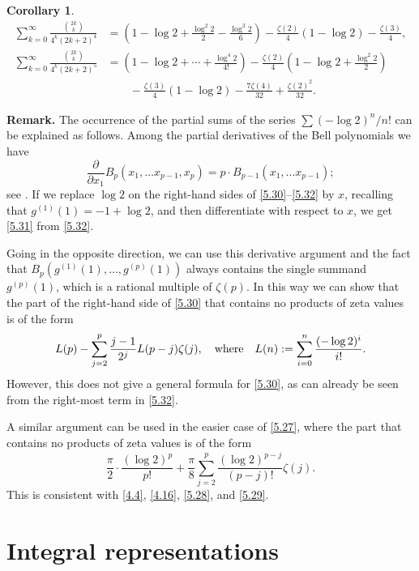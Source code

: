 \documentclass{amsart}
\newtheorem{corollary}[theorem]{Corollary}
\theoremstyle{definition}
\theoremstyle{remark}
\numberwithin{equation}{section}
\begin{document}
\begin{corollary}\label{cor:5.5}
\begin{align}
\sum_{k=0}^\infty\frac{\binom{2k}{k}}{4^k(2k+2)^4}
&=\left(1-\log{2}+\frac{\log^2{2}}{2}-\frac{\log^3{2}}{6}\right)
-\frac{\zeta(2)}{4}(1-\log{2})-\frac{\zeta(3)}{4},\label{5.31}\\
\sum_{k=0}^\infty\frac{\binom{2k}{k}}{4^k(2k+2)^5}
&=\left(1-\log{2}+\cdots+\frac{\log^4{2}}{4!}\right)
-\frac{\zeta(2)}{4}\left(1-\log{2}+\frac{\log^2{2}}{2}\right)\label{5.32}\\
&\qquad-\frac{\zeta(3)}{4}(1-\log{2})-\frac{7\zeta(4)}{32}+\frac{\zeta(2)^2}{32}.\nonumber
\end{align}
\end{corollary}

\noindent
{\bf Remark.} The occurrence of the partial sums of the series
$\sum(-\log{2})^n/n!$ can be explained as follows. Among the partial derivatives
of the Bell polynomials we have
\begin{equation}\label{5.33}
\frac{\partial}{\partial x_1}B_p(x_1,\ldots x_{p-1},x_p) 
= p\cdot B_{p-1}(x_1,\ldots x_{p-1});
\end{equation}
see \cite[p.~266]{Be}. If we replace $\log{2}$ on the right-hand sides of 
\eqref{5.30}--\eqref{5.32} by $x$, recalling that $g^{(1)}(1)=-1+\log{2}$, and
then differentiate with respect to $x$, we get \eqref{5.31} from \eqref{5.32}.

Going in the opposite direction, we can use this derivative argument and the 
fact that $B_{p}(g^{(1)}(1),\ldots,g^{(p)}(1))$ always contains the single 
summand $g^{(p)}(1)$, which is a rational multiple of $\zeta(p)$. In this way 
we can show that the part of the right-hand side of \eqref{5.30} that contains 
no products of zeta values is of the form
\[
L(p)-\sum_{j=2}^p\frac{j-1}{2^j}L(p-j)\zeta(j),\quad\hbox{where}\quad
L(n):=\sum_{i=0}^n\frac{(-\log{2})^i}{i!}.
\]
However, this does not give a general formula for \eqref{5.30}, as can 
already be seen from the right-most term in \eqref{5.32}.

A similar argument can be used in the easier case of \eqref{5.27}, where the 
part that contains no products of zeta values is of the form
\[
\frac{\pi}{2}\cdot\frac{(\log{2})^p}{p!}
+\frac{\pi}{8}\sum_{j=2}^p\frac{(\log{2})^{p-j}}{(p-j)!}\zeta(j).
\]
This is consistent with \eqref{4.4}, \eqref{4.16}, \eqref{5.28}, and
\eqref{5.29}.

\section{Integral representations}\label{sec:6}
\end{document}
